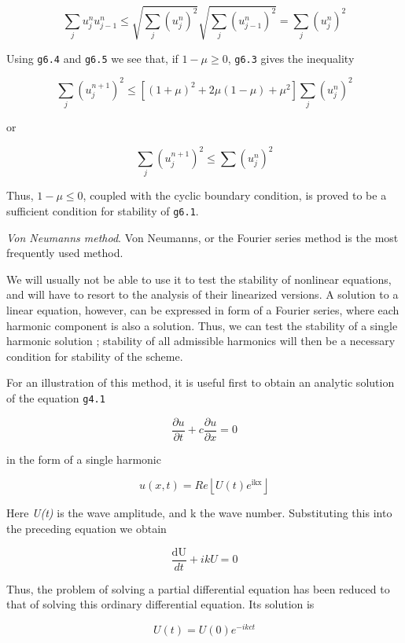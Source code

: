     {\[\sum_{j}^{}u_{j}^{n}u_{j - 1}^{n} \leq \sqrt{\sum_{j}^{}\left( u_{j}^{n} \right)^{2}}\sqrt{\sum_{j}^{}
    \left( u_{j - 1}^{n} \right)^{2}} =\sum_{j}^{}\left( u_{j}^{n} \right)^{2}\]}

Using \texttt{g6.4} and \texttt{g6.5} we see that, if
\(1 - \mu \geq 0\), \texttt{g6.3} gives the inequality

\[{\sum_{j}^{}\left( u_{j}^{n + 1} \right)}^{2} \leq \left\lbrack \left( 1 + \mu \right)^{2} +
2\mu\left( 1 - \mu \right) + \mu^{2} \right\rbrack\sum_{j}^{}\left( u_{j}^{n} \right)^{2}\]

or

\[{\sum_{j}^{}\left( u_{j}^{n + 1} \right)}^{2} \leq \sum_{}^{}\left( u_{j}^{n} \right)^{2}\]

Thus, \( 1 - \mu \leq 0\), coupled with the cyclic boundary condition,
is proved to be a sufficient condition for stability of \texttt{g6.1}.

\emph{Von Neumann\textquotesingle s method}. Von
Neumann\textquotesingle s, or the Fourier series method is the most
frequently used method.

We will usually not be able to use it to test the stability of nonlinear
equations, and will have to resort to the analysis of their linearized
versions. A solution to a linear equation, however, can be expressed in
form of a Fourier series, where each harmonic component is also a
solution. Thus, we can test the stability of a single harmonic solution
; stability of all admissible harmonics will then be a necessary
condition for stability of the scheme.

For an illustration of this method, it is useful first to obtain an
analytic solution of the equation \texttt{g4.1}

\[\frac{\partial u}{\partial t}+c \frac{\partial u}{\partial x}=0\]

in the form of a single harmonic

    {\[u\left( x,t \right) = Re\left\lfloor U\left( t \right)e^{\text{ikx}} \right\rfloor\]}

Here \emph{U(t)} is the wave amplitude, and k the wave number.
Substituting this into the preceding equation we obtain

\[\frac{\text{dU}}{d t} +ikU = 0\]

Thus, the problem of solving a partial differential equation has been
reduced to that of solving this ordinary differential equation. Its
solution is

\[U(t) =U(0)e^{- ikct}\]


